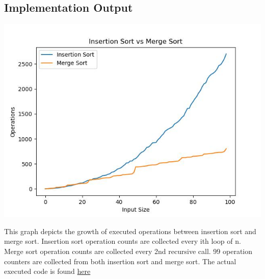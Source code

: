 \documentclass{article}
\begin{document}
\subsection{Implementation Output}
\begin{center}
\includegraphics[scale=0.5]{complexity.jpg}
    
\end{center}
This graph depicts the growth of executed operations between insertion sort and merge sort. Insertion sort operation counts are collected every ith loop of n. Merge sort operation counts are collected every 2nd recursive call. 99 operation counters are collected from both insertion sort and merge sort. The actual executed code is found  \href{https://github.com/Tony363/5511/blob/main/hw1/hw1_code.py}{here}{
\printbibliography}
\end{document}
